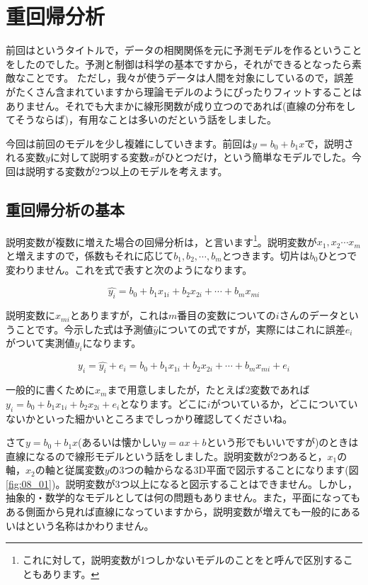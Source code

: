 \documentclass{ltjbook}
\begin{document}
\chapter{重回帰分析}
\label{ch08_MultipleRegression}

前回はというタイトルで，データの相関関係を元に予測モデルを作るということをしたのでした。予測と制御は科学の基本ですから，それができるとなったら素敵なことです。
ただし，我々が使うデータは人間を対象にしているので，誤差がたくさん含まれていますから理論モデルのようにぴったりフィットすることはありません。それでも大まかに線形関数が成り立つのであれば(直線の分布をしてそうならば)，有用なことは多いのだという話をしました。

今回は前回のモデルを少し複雑にしていきます。前回は$y=b_0+b_1x$で，説明される変数$y$に対して説明する変数$x$がひとつだけ，という簡単なモデルでした。今回は説明する変数が2つ以上のモデルを考えます。

\section{重回帰分析の基本}
説明変数が複数に増えた場合の回帰分析は，と言います\footnote{これに対して，説明変数が1つしかないモデルのことをと呼んで区別することもあります。}。説明変数が$x_1,x_2\cdots x_m$と増えますので，係数もそれに応じて$b_1,b_2,\cdots,b_m$とつきます。切片は$b_0$ひとつで変わりません。これを式で表すと次のようになります。

\[\hat{y_i}=b_0 + b_1x_{1i}+b_2x_{2i}+\cdots+b_mx_{mi}\]

説明変数に$x_{mi}$とありますが，これは$m$番目の変数についての$i$さんのデータということです。今示した式は予測値$\hat{y}$についての式ですが，実際にはこれに誤差$e_i$がついて実測値$y_i$になります。

\[ y_i = \hat{y_i} + e_i = b_0 + b_1x_{1i}+b_2x_{2i}+\cdots+b_mx_{mi} + e_i \]

一般的に書くために$x_m$まで用意しましたが，たとえば2変数であれば$y_i = b_0 + b_1x_{1i}+b_2x_{2 i}+e_i$となります。どこに$i$がついているか，どこについていないかといった細かいところまでしっかり確認してくださいね。

さて$y=b_0 + b_1 x$(あるいは懐かしい$y=ax+b$という形でもいいですが)のときは直線になるので線形モデルという話をしました。説明変数が2つあると，$x_1$の軸，$x_2$の軸と従属変数$y$の3つの軸からなる3D平面で図示することになります(図\ref{fig:08_01})。説明変数が3つ以上になると図示することはできません。しかし，抽象的・数学的なモデルとしては何の問題もありません。また，平面になってもある側面から見れば直線になっていますから，説明変数が増えても一般的にあるいはという名称はかわりません。
\end{document}
